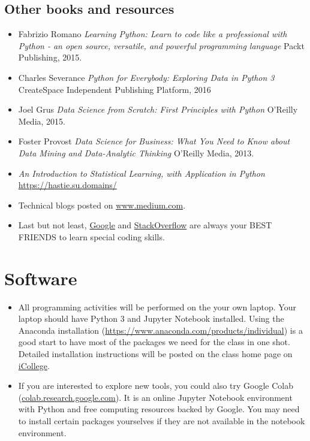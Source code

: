 \documentclass{article}
\begin{document}
\subsection{Other books and resources}
  \begin{itemize}
  	\item Fabrizio Romano  \textit{Learning Python: Learn to code like a professional with Python - an open source, versatile, and powerful programming language} Packt Publishing, 2015.
  	\item Charles Severance \textit{Python for Everybody: Exploring Data in Python 3} CreateSpace Independent Publishing Platform, 2016 
    \item Joel Grus \textit{Data Science from Scratch: First Principles with Python} O'Reilly Media, 2015.
    \item Foster Provost \textit{Data Science for Business: What You Need to Know about Data Mining and Data-Analytic Thinking} O'Reilly Media, 2013.
    \item \textit{An Introduction to Statistical Learning, with Application in Python} \url{https://hastie.su.domains/}
    \item Technical blogs posted on \url{www.medium.com}.
    \item Last but not least, \href{www.google.com}{Google} and \href{www.stackoverflow.com}{StackOverflow} are always your BEST FRIENDS to learn special coding skills.
  \end{itemize}


\section{Software}
\begin{itemize}
	\item All programming activities will be performed on the your own laptop. Your laptop should have Python 3 and Jupyter Notebook installed. Using the Anaconda installation (\url{https://www.anaconda.com/products/individual}) is a good start to have most of the packages we need for the class in one shot. Detailed installation instructions will be posted on the class home page on \href{https://gastate.view.usg.edu/d2l/home/2822689}{iCollege}.
	\item If you are interested to explore new tools, you could also try Google Colab (\url{colab.research.google.com}). It is an online Jupyter Notebook environment with Python and free computing resources backed by Google. You may need to install certain packages yourselves if they are not available in the notebook environment.
\end{itemize}
\end{document}
